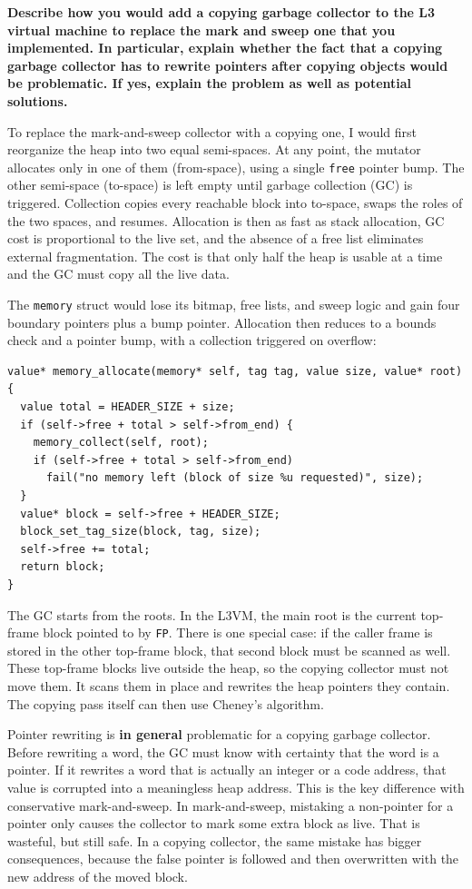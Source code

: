 \documentclass[11pt]{article}
\begin{document}
\begin{center}
    {\bfseries
    Describe how you would add a copying garbage collector to the L3 virtual machine to replace the mark and sweep one that you implemented. In particular, explain whether the fact that a copying garbage collector has to rewrite pointers after copying objects would be problematic. If yes, explain the problem as well as potential solutions.
    }
\end{center}
\vspace{-2mm}
To replace the mark-and-sweep collector with a copying one, I would first reorganize the heap into two equal semi-spaces. At any point, the mutator allocates only in one of them (from-space), using a single \texttt{free} pointer bump. The other semi-space (to-space) is left empty until garbage collection (GC) is triggered. Collection copies every reachable block into to-space, swaps the roles of the two spaces, and resumes. Allocation is then as fast as stack allocation, GC cost is proportional to the live set, and the absence of a free list eliminates external fragmentation. The cost is that only half the heap is usable at a time and the GC must copy all the live data.

The \texttt{memory} struct would lose its bitmap, free lists, and sweep logic and gain four boundary pointers plus a bump pointer. Allocation then reduces to a bounds check and a pointer bump, with a collection triggered on overflow:

\begin{lstlisting}
value* memory_allocate(memory* self, tag tag, value size, value* root) {
  value total = HEADER_SIZE + size;
  if (self->free + total > self->from_end) {
    memory_collect(self, root);
    if (self->free + total > self->from_end)
      fail("no memory left (block of size %u requested)", size);
  }
  value* block = self->free + HEADER_SIZE;
  block_set_tag_size(block, tag, size);
  self->free += total;
  return block;
}
\end{lstlisting}
The GC starts from the roots. In the L3VM, the main root is the current top-frame block pointed to by \texttt{FP}. There is one special case: if the caller frame is stored in the other top-frame block, that second block must be scanned as well. These top-frame blocks live outside the heap, so the copying collector must not move them. It scans them in place and rewrites the heap pointers they contain. The copying pass itself can then use Cheney's algorithm. 

Pointer rewriting is \textbf{in general} problematic for a copying garbage collector. Before rewriting a word, the GC must know with certainty that the word is a pointer. If it rewrites a word that is actually an integer or a code address, that value is corrupted into a meaningless heap address. This is the key difference with conservative mark-and-sweep. In mark-and-sweep, mistaking a non-pointer for a pointer only causes the collector to mark some extra block as live. That is wasteful, but still safe. In a copying collector, the same mistake has bigger consequences, because the false pointer is followed and then overwritten with the new address of the moved block. 
\end{document}
